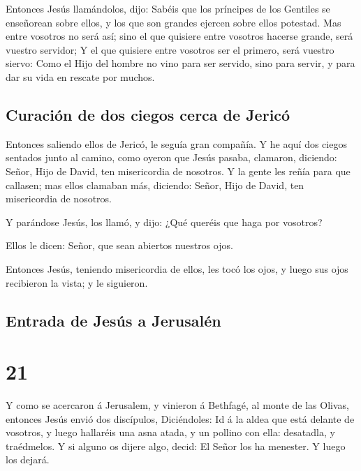  Entonces Jesús llamándolos, dijo: Sabéis que los
príncipes de los Gentiles se enseñorean sobre ellos, y los que son
grandes ejercen sobre ellos potestad.  Mas entre vosotros
no será así; sino el que quisiere entre vosotros hacerse grande, será
vuestro servidor;  Y el que quisiere entre vosotros ser
el primero, será vuestro siervo:  Como el Hijo del hombre
no vino para ser servido, sino para servir, y para dar su vida en
rescate por muchos.

\hypertarget{curaciuxf3n-de-dos-ciegos-cerca-de-jericuxf3}{%
\subsection{Curación de dos ciegos cerca de
Jericó}\label{curaciuxf3n-de-dos-ciegos-cerca-de-jericuxf3}}

 Entonces saliendo ellos de Jericó, le seguía gran
compañía.  Y he aquí dos ciegos sentados junto al camino,
como oyeron que Jesús pasaba, clamaron, diciendo: Señor, Hijo de David,
ten misericordia de nosotros.  Y la gente les reñía para
que callasen; mas ellos clamaban más, diciendo: Señor, Hijo de David,
ten misericordia de nosotros.

 Y parándose Jesús, los llamó, y dijo: ¿Qué queréis que
haga por vosotros?

 Ellos le dicen: Señor, que sean abiertos nuestros ojos.

 Entonces Jesús, teniendo misericordia de ellos, les tocó
los ojos, y luego sus ojos recibieron la vista; y le siguieron.

\hypertarget{entrada-de-jesuxfas-a-jerusaluxe9n}{%
\subsection{Entrada de Jesús a
Jerusalén}\label{entrada-de-jesuxfas-a-jerusaluxe9n}}

\hypertarget{section-40-21}{%
\section{21}\label{section-40-21}}

 Y como se acercaron á Jerusalem, y vinieron á Bethfagé,
al monte de las Olivas, entonces Jesús envió dos discípulos,
 Diciéndoles: Id á la aldea que está delante de vosotros,
y luego hallaréis una asna atada, y un pollino con ella: desatadla, y
traédmelos.  Y si alguno os dijere algo, decid: El Señor
los ha menester. Y luego los dejará.

